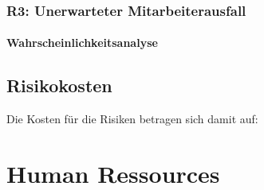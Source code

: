 \subsubsection{R3: Unerwarteter Mitarbeiterausfall}
\paragraph{Wahrscheinlichkeitsanalyse}

\subsection{Risikokosten}

Die Kosten für die Risiken betragen sich damit auf:



\section{Human Ressources}

